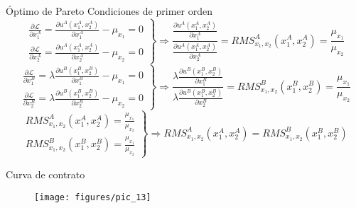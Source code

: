 \begin{frame}{Óptimo de Pareto}
	Condiciones de primer orden
		$$	\left.
				\begin{array}{l}
					\frac{\partial \mathscr{L}}{\partial x_{1}^{A}}=\frac{\partial u^{A}\left( x_{1}^{A},x_{2}^{A}\right)}{\partial x_{1}^{A}}-\mu_{x_1}=0 \\ [.5cm]
					\frac{\partial \mathscr{L}}{\partial x_{2}^{A}}=\frac{\partial u^{A}\left( x_{1}^{A},x_{2}^{A}\right)}{\partial x_{2}^{A}}-\mu_{x_2}=0
				\end{array}
			\right\} \Rightarrow \frac{\frac{\partial u^{A}\left( x_{1}^{A},x_{2}^{A}\right)}{\partial x_{1}^{A}}}{\frac{\partial u^{A}\left( x_{1}^{A},x_{2}^{A}\right)}{\partial x_{2}^{A}}}=RMS_{x_1,x_2}^{A}\left( x_{1}^{A},x_{2}^{A}\right)=\frac{\mu_{x_1}}{\mu_{x_2}}$$
		\bigskip
		$$	\left.
				\begin{array}{l}
					\frac{\partial \mathscr{L}}{\partial x_{1}^{B}}=\lambda \frac{\partial u^{B}\left( x_{1}^{B},x_{2}^{B}\right)}{\partial x_{1}^{B}}-\mu_{x_1}=0 \\  [.5cm]
					\frac{\partial \mathscr{L}}{\partial x_{2}^{B}}=\lambda \frac{\partial u^{B}\left( x_{1}^{B},x_{2}^{B}\right)}{\partial x_{2}^{B}}-\mu_{x_2}=0
				\end{array}
			\right\} \Rightarrow \frac{\lambda \frac{\partial u^{B}\left( x_{1}^{B},x_{2}^{B}\right)}{\partial x_{1}^{B}}}{\lambda\frac{\partial u^{B}\left( x_{1}^{B},x_{2}^{B}\right)}{\partial x_{2}^{B}}}=RMS_{x_1,x_2}^{B}\left( x_{1}^{B},x_{2}^{B}\right)=\frac{\mu_{x_1}}{\mu_{x_2}}$$
		\bigskip
		$$	\left.
				\begin{array}{l}
					RMS_{x_1,x_2}^{A}\left( x_{1}^{A},x_{2}^{A}\right)=\frac{\mu_{x_1}}{\mu_{x_2}}\\  [.5cm]
					RMS_{x_1,x_2}^{B}\left( x_{1}^{B},x_{2}^{B}\right)=\frac{\mu_{x_1}}{\mu_{x_2}}
				\end{array}
			\right\} \Rightarrow RMS_{x_1,x_2}^{A}\left( x_{1}^{A},x_{2}^{A}\right) = RMS_{x_1,x_2}^{B}\left( x_{1}^{B},x_{2}^{B}\right)$$
\end{frame}
\begin{frame}{Curva de contrato}
		\begin{figure}
			\centering
			\texttt{[image: figures/pic\_13]}
		\end{figure}
\end{frame}